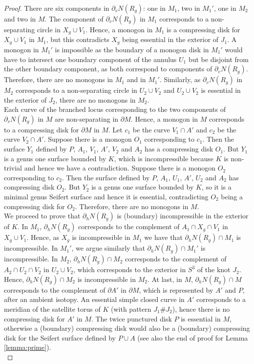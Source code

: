 \documentclass[10pt,a4paper]{amsart}
\begin{document}
\begin{proof}
There are six components in $\partial_v N(R_g)$: one in $M_1$,  two in $M_1'$, one in $M_2$ and two in $M$.  The component of $\partial_v N(R_g)$ in $M_1$ corresponds to a non-separating circle in $X_g\cup V_1$.  Hence, a monogon in $M_1$  is a compressing disk for $X_g\cup V_1$ in $M_1$,  but this contradicts $X_g$ being essential in the exterior of $J_1$.  A monogon in $M_1'$ is impossible as the boundary of a monogon disk in $M_1'$ would have to intersect one boundary component of the annulus $U_1$ but be disjoint from the other boundary component,  as both correspond to components of $\partial_v N(R_g)$.  Therefore,  there are no monogons in $M_1$ and in $M_1'$.  Similarly, as $\partial_v N(R_g)$ in $M_2$ corresponds to a non-separating circle in $U_2\cup V_2$ and $U_2\cup V_2$ is essential in the exterior of $J_2$,   there are no monogons in $M_2$.\\
Each curve of the branched locus corresponding to the two components of $\partial_v N(R_g)$ in $M$ are non-separating in $\partial M$. Hence,  a monogon in $M$ corresponds to a compressing disk for $\partial M$ in $M$. Let $c_1$ be the curve $V_1\cap A'$ and $c_2$ be the curve $V_2\cap A'$. Suppose there is a monogon $O_1$ corresponding to $c_1$. Then the surface $Y_1$ defined by $P$, $A_1$, $V_1$, $A'$, $V_2$ and $A_2$ has a compressing disk $O_1$.  But $Y_1$ is a genus one surface bounded by $K$, which is incompressible because $K$ is non-trivial and hence we have a contradiction. Suppose there is a monogon $O_2$ corresponding to $c_2$.  Then the surface defined by $P, \, A_1, \, U_1, \, A', \,  U_2$ and $A_2$ has compressing disk $O_2$.  But $Y_2$ is a genus one surface bounded by $K$,  so it is a minimal genus Seifert surface and hence it is essential, contradicting $O_2$ being a compressing disk for $O_2$.  Therefore, there are no monogons in $M$.\\  


We proceed to prove that $\partial_h N(R_g)$ is (boundary) incompressible in the exterior of $K$. In $M_1$,  $\partial_h N(R_g)$ corresponds to the complement of $A_1 \cap X_g \cap V_1$ in $X_g\cup V_1$. Hence,  as $X_g$ is incompressible in $M_1$ we have that $\partial_h N(R_g)\cap M_1$ is incompressible.  In $M_1'$, we argue similarly that  $\partial_h N(R_g)\cap M_1'$ is incompressible.  In $M_2$, $\partial_h N(R_g)\cap M_2$ corresponds to the complement of $A_2 \cap U_2 \cap V_2$ in $U_2\cup V_2$, which corresponds to the exterior in $S^3$ of the knot $J_2$. Hence, $\partial_h N(R_g)\cap M_2$ is incompressible in $M_2$. At last, in $M$, $\partial_h N(R_g)\cap M$ corresponds to the complement of $\partial A'$ in $\partial M$, which is represented by $A'$ and $P$, after an ambient isotopy. An essential simple closed curve in $A'$ corresponds to a meridian of the satellite torus of $K$ (with pattern $J_1\#J_2$), hence there is no compressing disk for $A'$ in $M$. The twice punctured disk $P$ is essential in $M$, otherwise a (boundary) compressing disk would also be a (boundary) compressing disk for the Seifert surface defined by $P\cup A$  (see also the end of proof for Lemma \ref{lemma:prime}).\\



\end{proof}
\end{document}

